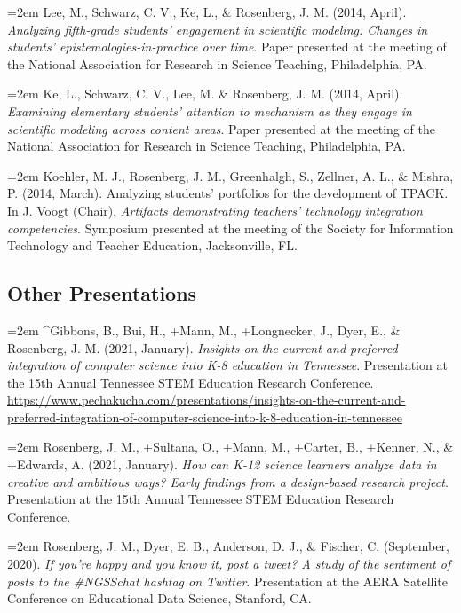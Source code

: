 \documentclass[
  14,
]{article}
\begin{document}
\hangindent=2em Lee, M., Schwarz, C. V., Ke, L., \& Rosenberg, J. M.
(2014, April). \emph{Analyzing fifth-grade students' engagement in
scientific modeling: Changes in students' epistemologies-in-practice
over time}. Paper presented at the meeting of the National Association
for Research in Science Teaching, Philadelphia, PA.

\hangindent=2em Ke, L., Schwarz, C. V., Lee, M. \& Rosenberg, J. M.
(2014, April). \emph{Examining elementary students' attention to
mechanism as they engage in scientific modeling across content areas}.
Paper presented at the meeting of the National Association for Research
in Science Teaching, Philadelphia, PA.

\hangindent=2em Koehler, M. J., Rosenberg, J. M., Greenhalgh, S.,
Zellner, A. L., \& Mishra, P. (2014, March). Analyzing students'
portfolios for the development of TPACK. In J. Voogt (Chair),
\emph{Artifacts demonstrating teachers' technology integration
competencies}. Symposium presented at the meeting of the Society for
Information Technology and Teacher Education, Jacksonville, FL.

\hypertarget{other-presentations}{%
\subsection{Other Presentations}\label{other-presentations}}

\hangindent=2em \^{}Gibbons, B., Bui, H., +Mann, M., +Longnecker, J.,
Dyer, E., \& Rosenberg, J. M. (2021, January). \emph{Insights on the
current and preferred integration of computer science into K-8 education
in Tennessee}. Presentation at the 15th Annual Tennessee STEM Education
Research Conference.
\url{https://www.pechakucha.com/presentations/insights-on-the-current-and-preferred-integration-of-computer-science-into-k-8-education-in-tennessee}

\hangindent=2em Rosenberg, J. M., +Sultana, O., +Mann, M., +Carter, B.,
+Kenner, N., \& +Edwards, A. (2021, January). \emph{How can K-12 science
learners analyze data in creative and ambitious ways? Early findings
from a design-based research project}. Presentation at the 15th Annual
Tennessee STEM Education Research Conference.

\hangindent=2em Rosenberg, J. M., Dyer, E. B., Anderson, D. J., \&
Fischer, C. (September, 2020). \emph{If you're happy and you know it,
post a tweet? A study of the sentiment of posts to the \#NGSSchat
hashtag on Twitter}. Presentation at the AERA Satellite Conference on
Educational Data Science, Stanford, CA.
\end{document}
